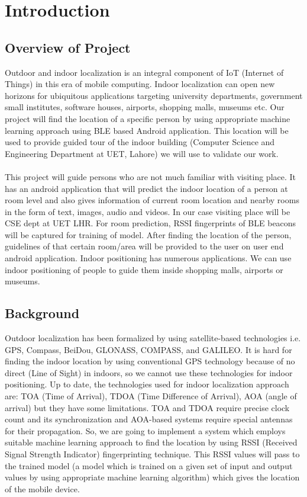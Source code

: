 \documentclass{article}
\begin{document}
\section{Introduction}

\subsection{Overview of Project}
Outdoor and indoor localization is an integral component of  IoT (Internet of Things) in this era of mobile computing. Indoor localization can open new horizons for ubiquitous applications targeting university departments, government small institutes, software houses, airports, shopping malls, museums etc. Our project will find the location of a specific person by using appropriate machine learning approach using BLE based Android application. This location will be used to provide guided tour of the indoor building (Computer Science and Engineering Department at UET, Lahore) we will use to validate our work. 
\\\\
This project will guide persons who are not much familiar with visiting place. It has an android application that will predict the indoor location of a person at room level and also gives information of current room location and nearby rooms in the form of text, images, audio and videos. In our case visiting place will be CSE dept at UET LHR. For room prediction, RSSI fingerprints of BLE beacons will be captured for training of model. After finding the location of the person, guidelines of that certain room/area will be provided to the user on user end android application. Indoor positioning has numerous applications. We can use indoor positioning of people to guide them inside shopping malls, airports or museums. 



\subsection{Background}
Outdoor localization has been formalized by using satellite-based technologies i.e. GPS\cite{GPS},
 Compass, BeiDou, GLONASS\cite{Loco}, COMPASS, and GALILEO\cite{GALILEO}. It is hard for finding the indoor location by using conventional GPS technology\cite{research1} because of no direct (Line of Sight)\cite{research2} in indoors, so we cannot use these technologies for indoor positioning. Up to date, the technologies used for indoor localization approach are: TOA (Time of Arrival), TDOA (Time Difference of Arrival), AOA (angle of arrival) but they have some limitations. TOA and TDOA require precise clock count and its synchronization and AOA-based systems require special antennas for their propagation. So, we are going to implement a system which employs suitable machine learning approach to find the location by using RSSI (Received Signal Strength Indicator) fingerprinting technique. This RSSI values will pass to the trained model (a model which is trained on a given set of input and output values by using appropriate machine learning algorithm) which gives the location of the mobile device.
\end{document}

